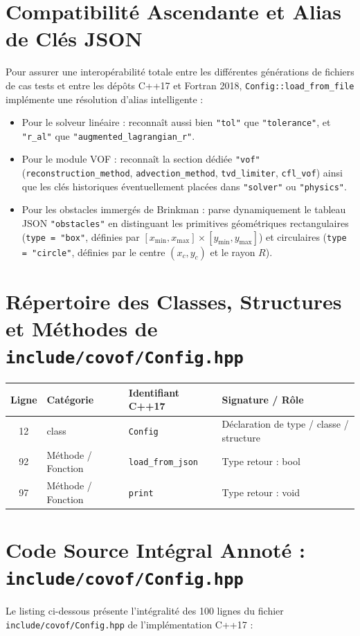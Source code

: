 \documentclass[10pt,a4paper,oneside]{book}
\begin{document}
\section{Compatibilité Ascendante et Alias de Clés JSON}
Pour assurer une interopérabilité totale entre les différentes générations de fichiers de cas tests et entre les dépôts C++17 et Fortran 2018, \texttt{Config::load\_from\_file} implémente une résolution d'alias intelligente :
\begin{itemize}
  \item Pour le solveur linéaire : reconnaît aussi bien \texttt{"tol"} que \texttt{"tolerance"}, et \texttt{"r\_al"} que \texttt{"augmented\_lagrangian\_r"}.
  \item Pour le module VOF : reconnaît la section dédiée \texttt{"vof"} (\texttt{reconstruction\_method}, \texttt{advection\_method}, \texttt{tvd\_limiter}, \texttt{cfl\_vof}) ainsi que les clés historiques éventuellement placées dans \texttt{"solver"} ou \texttt{"physics"}.
  \item Pour les obstacles immergés de Brinkman : parse dynamiquement le tableau JSON \texttt{"obstacles"} en distinguant les primitives géométriques rectangulaires (\texttt{type = "box"}, définies par $[x_{\min}, x_{\max}] \times [y_{\min}, y_{\max}]$) et circulaires (\texttt{type = "circle"}, définies par le centre $(x_c, y_c)$ et le rayon $R$).
\end{itemize}

\section{Répertoire des Classes, Structures et Méthodes de \texttt{include/covof/Config.hpp}}
\begin{center}\small
\begin{tabular}{clll}
\toprule
\textbf{Ligne} & \textbf{Catégorie} & \textbf{Identifiant C++17} & \textbf{Signature / Rôle} \\
\midrule
12 & class & \texttt{Config} & Déclaration de type / classe / structure \\
92 & Méthode / Fonction & \texttt{load\_from\_json} & Type retour : bool \\
97 & Méthode / Fonction & \texttt{print} & Type retour : void \\
\bottomrule
\end{tabular}
\end{center}

\section{Code Source Intégral Annoté : \texttt{include/covof/Config.hpp}}
Le listing ci-dessous présente l'intégralité des 100 lignes du fichier \texttt{include/covof/Config.hpp} de l'implémentation C++17 :
\end{document}
